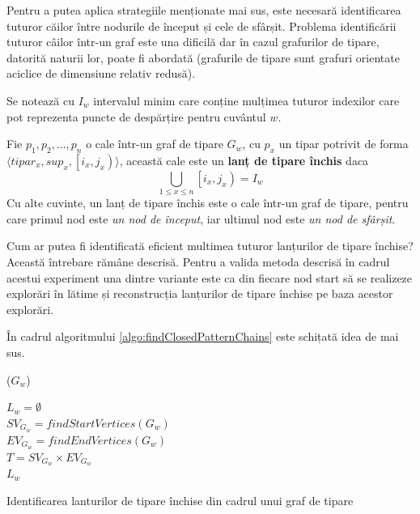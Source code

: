 Pentru a putea aplica strategiile menționate mai sus, este necesară identificarea tuturor căilor între nodurile de început și cele de sfârșit. Problema identificării tuturor câilor într-un graf este una dificilă dar în cazul grafurilor de tipare, datorită naturii lor, poate fi abordată (grafurile de tipare sunt grafuri orientate aciclice de dimensiune relativ redusă). 

\begin{defi}
Se notează cu $I_w$ intervalul minim care conține mulțimea tuturor indexilor care pot reprezenta puncte de despărțire pentru cuvântul $w$.
\end{defi}

\begin{defi}
Fie $p_1, p_2, ..., p_n$ o cale într-un graf de tipare $G_w$, cu $p_x$ un tipar potrivit de forma $\langle tipar_x, sup_x, \left[i_x,j_x\right)\rangle$, această cale este un \textbf{lanț de tipare închis} daca 
\begin{equation}
\bigcup_{1 \leq x \leq n} \left[i_x,j_x\right) = I_w
\end{equation}
Cu alte cuvinte, un lanț de tipare închis este o cale într-un graf de tipare, pentru care primul nod este \textit{un nod de început}, iar ultimul nod este \textit{un nod de sfârșit}.
\end{defi}

Cum ar putea fi identificată eficient multimea tuturor lanțurilor de tipare închise? Această întrebare rămâne descrisă. Pentru a valida metoda descrisă în cadrul acestui experiment una dintre variante este ca din fiecare nod start să se realizeze explorări în lătime și reconstrucția lanțurilor de tipare închise pe baza acestor explorări. 

În cadrul algoritmului \ref{algo:findClosedPatternChains} este schițată idea de mai sus.

\begin{algorithm}[H]
\SetAlgoLined
{}

\ppg($G_w$) \\


$L_w = \emptyset$ \\
$SV_{G_w} = findStartVertices(G_w)$ \\
$EV_{G_w} = findEndVertices(G_w)$ \\
$T = SV_{G_w} \times EV_{G_w}$ \\
\KwRet $L_w$
\vspace{.1cm}

\caption{Identificarea lanturilor de tipare închise din cadrul unui graf de tipare}
\label{algo:findClosedPatternChains}
\end{algorithm}

